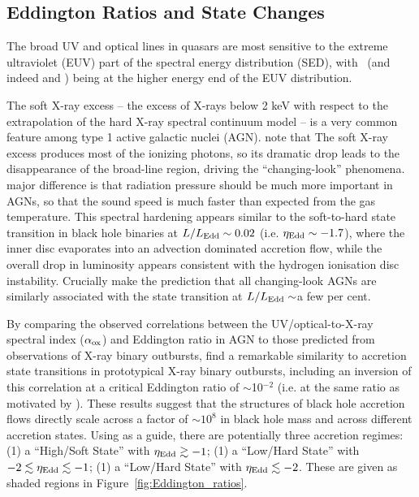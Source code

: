 \documentclass[fleqn,usenatbib]{mnras}
\begin{document}
\subsection{Eddington Ratios and State Changes} 
The broad UV and optical lines in quasars are most sensitive to the
extreme ultraviolet (EUV) part of the spectral energy distribution
(SED), with \civ\ (and indeed \heii and \nv) being at the higher
energy end of the EUV distribution.

The soft X-ray excess -- the excess of X-rays below 2 keV with respect
to the extrapolation of the hard X-ray spectral continuum model -- is
a very common feature among type 1 active galactic nuclei (AGN). 
\citet{NodaDone2018} note that
The soft X-ray excess produces most of the ionizing photons, so its
dramatic drop leads to the disappearance of the broad-line region,
driving the ``changing-look'' phenomena.  major difference is that
radiation pressure should be much more important in AGNs, so that the
sound speed is much faster than expected from the gas temperature.
This spectral hardening appears similar to the soft-to-hard state
transition in black hole binaries at $L / L_{\rm Edd} \sim 0.02$
(i.e. $\eta_{\rm Edd} \sim -1.7$), where the inner disc evaporates into
an advection dominated accretion flow, while the overall drop in
luminosity appears consistent with the hydrogen ionisation disc
instability.  Crucially \citet{NodaDone2018} make the prediction that
all changing-look AGNs are similarly associated with the state
transition at $L / L_{\rm Edd} \sim$a few per cent.

By comparing the observed correlations between the UV/optical-to-X-ray
spectral index ($\alpha_{\rm ox}$) and Eddington ratio in AGN to those
predicted from observations of X-ray binary outbursts,
\citet{Ruan2019a} find a remarkable similarity to accretion state transitions in prototypical
X-ray binary outbursts, including an inversion of this correlation at
a critical Eddington ratio of $\sim$10$^{-2}$ (i.e. at the same ratio
as motivated by \citet{NodaDone2018}).  These results suggest that the
structures of black hole accretion flows directly scale across a
factor of $\sim10^{8}$ in black hole mass and across different
accretion states. Using \citet{Ruan2019a} as a guide, there are potentially three accretion regimes: 
(1) a ``High/Soft State'' with $\eta_{\rm Edd} \gtrsim -1$; 
(1) a ``Low/Hard State'' with $-2 \lesssim \eta_{\rm Edd} \lesssim  -1$;
(1) a ``Low/Hard State'' with $\eta_{\rm Edd} \lesssim -2$.
These are given as shaded regions in Figure~\ref{fig:Eddington_ratios}.
\end{document}
